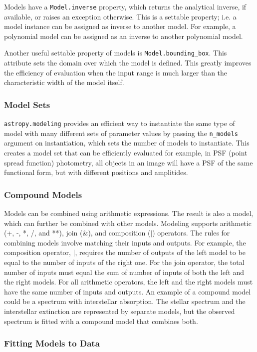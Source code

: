 \documentclass[modern]{aastex61}
\newcommand{\package}[1]{\texttt{#1}\xspace}
\begin{document}
Models have a \texttt{Model.inverse} property, which returns the analytical inverse, if available, or raises an exception otherwise. This is a settable property; i.e. a model instance can be assigned as inverse to another model. For example, a polynomial model can be assigned as an inverse to another polynomial model.

Another useful settable property of models is \texttt{Model.bounding\_box}. This attribute sets the domain over which the model is defined. This greatly improves the efficiency of evaluation when the input range is much larger than the characteristic width of the model itself.

\subsubsection{Model Sets}

\package{astropy.modeling} provides an efficient way to instantiate the same type of model with many different sets of parameter values by passing the \texttt{n\_models} argument on instantiation, which sets the number of models to instantiate. This creates a model set that can be efficiently evaluated for example, in PSF (point spread function) photometry, all objects in an image will have a PSF of the same functional form, but with different positions and amplitides.

\subsubsection{Compound Models}
Models can be combined using arithmetic expressions. The result is also a model, which can further be combined with other models. Modeling supports arithmetic (+, -, *, /, and **), join ($\&$), and composition ($|$) operators. The rules for combining models involve matching their inputs and outputs. For example, the composition operator, $|$, requires the number of outputs of the left model to be equal to the number of inputs of the right one. For the join operator, the total number of inputs must equal the sum of number of inputs of both the left and the right models. For all arithmetic operators, the left and the right models must have the same number of inputs and outputs. An example of a compound model could be a spectrum with interstellar absorption. The stellar spectrum and the interstellar extinction are represented by separate models, but the observed spectrum is fitted with a compound model that combines both.

\subsubsection{Fitting Models to Data}
\end{document}
